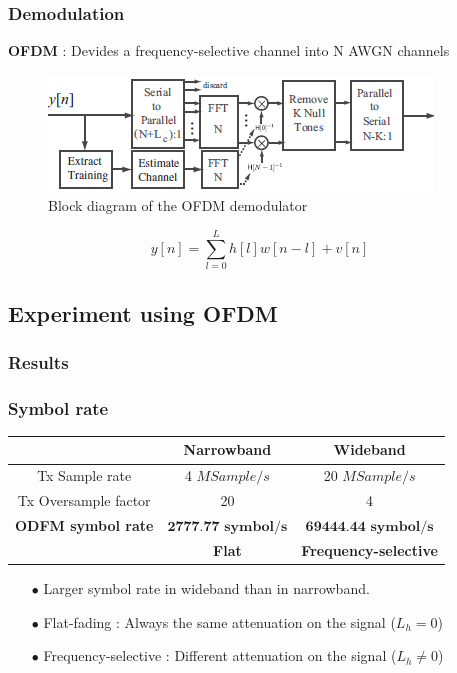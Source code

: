 \documentclass[11pt]{beamer}
\begin{document}
\begin{frame}
\frametitle{Demodulation}

\textbf{OFDM} : Devides a frequency-selective channel into N AWGN channels

\begin{figure}[!ht]
         \centering \includegraphics[scale=0.75]{img/OFDDM_demodulator.png}
 \caption{Block diagram of the OFDM demodulator}\label{fig3}  
\end{figure}
\begin{equation}  
 y[n]=\sum_{l=0}^{L} h[l]w[n-l]+v[n]
 \end{equation}
 

\end{frame}

\subsection{Experiment using OFDM}
\subsubsection{Results}

\begin{frame}
\frametitle{Symbol rate}
\begin{center}
	\begin{tabular}{c|c|c}
		  & Narrowband & Wideband\\
		  \hline
	Tx Sample rate & 4 $MSample/s$ & 20 $MSample/s$ \\	  
	Tx Oversample factor & 20 & 4\\
	\textbf{ODFM symbol rate} &  $\textbf{2777.77 symbol/s}$ & $\textbf{69444.44 symbol/s}$ \\ 
	\hline
     & \color{red} \textbf{Flat}  & \color{red} \textbf{Frequency-selective}\\                               
	\end{tabular}
	\label{tab1}
\end{center}



\begin{itemize}
\item[$\bullet$] Larger symbol rate in wideband than in narrowband.
\item[$\bullet$] Flat-fading : Always the same attenuation on the signal ($L_h=0$)
\item[$\bullet$] Frequency-selective : Different attenuation on the signal ($L_h \neq 0$)
\end{itemize}

\end{frame}
\end{document}
